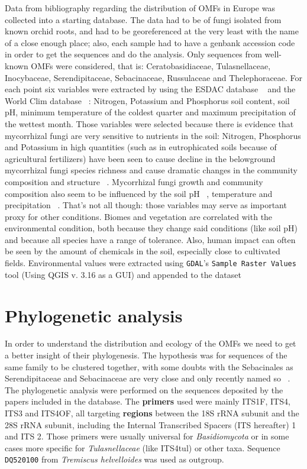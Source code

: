 Data from bibliography regarding the distribution of OMFs in Europe was collected into a starting database. The data had to be of fungi isolated from known orchid roots, and had to be georeferenced at the very least with the name of a close enough place; also, each sample had to have a genbank accession code in order to get the sequences and do the analysis.
Only sequences from well-known OMFs were considered, that is: Ceratobasidiaceae, Tulasnellaceae, Inocybaceae, Serendipitaceae, Sebacinaceae, Russulaceae and Thelephoraceae.
For each point six variables were extracted by using the ESDAC database ~\citep{esdac} and the World Clim database ~\citep{worldclim}: Nitrogen, Potassium and Phosphorus soil content, soil pH, minimum temperature of the coldest quarter and maximum precipitation of the wettest month. Those variables were selected because there is evidence that mycorrhizal fungi are very sensitive to nutrients in the soil: Nitrogen, Phosphorus and Potassium in high quantities (such as in eutrophicated soils because of agricultural fertilizers) have been seen to cause decline in the belowground mycorrhizal fungi species richness and cause dramatic changes in the community composition and structure ~\citep{lilleskov2002, baar2002, grant2011}. Mycorrhizal fungi growth and community composition also seem to be influenced by the soil pH ~\citep{aarle2002, carrino-kyker2016}, temperature and precipitation ~\citep{rillig2003}. That's not all though: those variables may serve as important proxy for other conditions. Biomes and vegetation are correlated with the environmental condition, both because they change said conditions (like soil pH) and because all species have a range of tolerance. Also, human impact can often be seen by the amount of chemicals in the soil, especially close to cultivated fields.
Environmental values were extracted using \texttt{GDAL}'s \texttt{Sample Raster Values} tool (Using QGIS v. 3.16 as a GUI) and appended to the dataset

\chapter{Phylogenetic analysis}
\label{phylogeneticanalysis}

In order to understand the distribution and ecology of the OMFs we need to get a better insight of their phylogenesis. The hypothesis was for sequences of the same family to be clustered together, with some doubts with the Sebacinales as Serendipitaceae and Sebacinaceae are very close and only recently named so ~\citep{weiss2016a}.
The phylogenetic analysis were performed on the sequences deposited by the papers included in the database.
The \textbf{primers} used were mainly ITS1F, ITS4, ITS3 and ITS4OF, all targeting \textbf{regions} between the 18S rRNA subunit and the 28S rRNA subunit, including the Internal Transcribed Spacers (ITS hereafter) 1 and ITS 2. Those primers were usually universal for \emph{Basidiomycota} or in some cases more specific for \emph{Tulasnellaceae} (like ITS4tul) or other taxa.
Sequence \texttt{DQ520100} from \emph{Tremiscus helvelloides} was used as outgroup.

